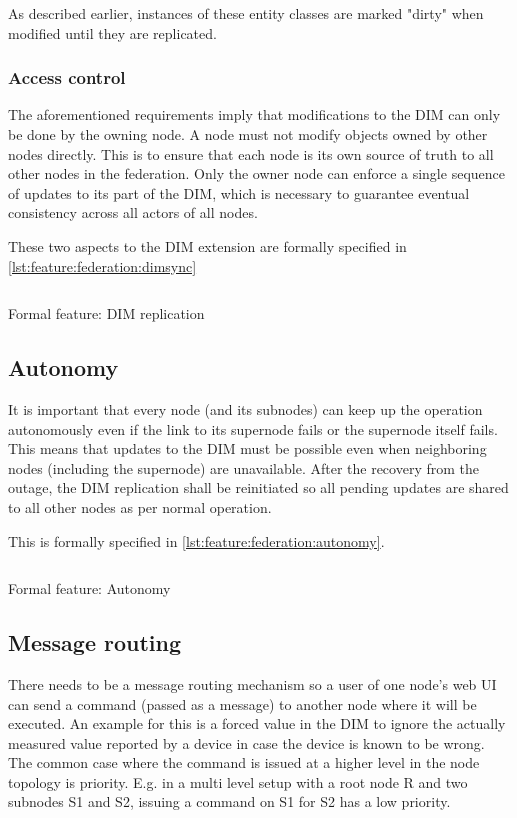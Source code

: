As described earlier, instances of these entity classes are marked "dirty" when
modified until they are replicated.

\subsubsection{Access control}
The aforementioned requirements imply that modifications to the \gls{DIM} can only be done by the
owning node. A node
must not modify objects owned by other nodes directly. This is to ensure that each node is its own source of truth
to all other nodes in the federation. Only the owner node can enforce a single
sequence of updates to its part of the DIM, which is necessary to guarantee
eventual consistency \cite[Chapter 5, Reliable Pub-Sub (Clone Pattern), Republishing
Updates from Clients]{zmq:zguide} across all actors of all nodes.

These two aspects to the DIM extension are formally specified in \autoref{lst:feature:federation:dimsync}

\begin{listing}
	\inputminted{Gherkin}{listings/features/federation/dim_extension.feature}
	\caption{Formal feature: DIM replication}
	\label{lst:feature:federation:dimsync}
\end{listing}

\subsection{Autonomy}
It is important that every node (and its subnodes) can keep up the operation autonomously even if the
link to its supernode fails or the supernode itself fails. This means that updates to
the \gls{DIM} must be possible even when neighboring nodes (including the supernode) are unavailable. After the
recovery from the outage, the \gls{DIM} replication shall be reinitiated so
all pending updates are shared to all other nodes as per normal operation.

This is formally specified in \autoref{lst:feature:federation:autonomy}.

\begin{listing}
	\inputminted{Gherkin}{listings/features/federation/autonomy.feature}
	\caption{Formal feature: Autonomy}
	\label{lst:feature:federation:autonomy}
\end{listing}

\subsection{Message routing}
There needs to be a message routing mechanism so a user
of one node's web UI can send a command (passed as a message) to another node where it will be
executed. An example for this is a forced value in the DIM to ignore the
actually measured value reported by a device in case the device is known to be
wrong. The common case where the command is issued at a higher level in the node
topology is priority. E.g. in a multi level setup with a root node R and two
subnodes S1 and S2, issuing a command on S1 for S2 has a low priority.

